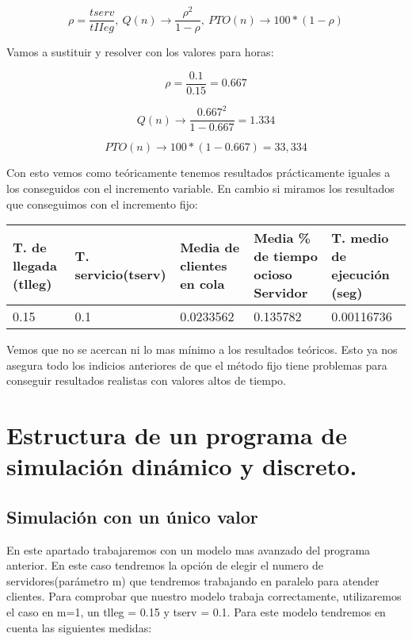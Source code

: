 \documentclass[]{article}
\begin{document}
$$\rho=\frac{ { tserv }}{ { tII eg }},\ Q(n) \rightarrow \frac{\rho^{2}}{1-\rho},\ P T O(n) \rightarrow 100 *(1-\rho)$$

Vamos a sustituir y resolver con los valores para horas:

$$\rho=\frac{ { 0.1 }}{ { 0.15 }} = 0.667 $$

$$Q(n) \rightarrow \frac{0.667^{2}}{1-0.667} = 1.334 $$

$$P T O(n) \rightarrow 100*(1-0.667) = 33,334$$

Con esto vemos como teóricamente tenemos resultados prácticamente iguales a los conseguidos con el incremento variable. En cambio si miramos los resultados que conseguimos con el incremento fijo:
\begin{table}[H]
	\begin{center}
		\begin{tabularx}{0.9\textwidth}{|X|X|X|X|X|}
			\hline
			\textbf{T. de llegada (tlleg)} & \textbf{T. servicio(tserv)}&\textbf{Media de clientes en cola} & \textbf{Media \% de tiempo ocioso Servidor} & \textbf{T. medio de ejecución (seg)} \\
			\hline \hline
			0.15 & 0.1 & 0.0233562 & 0.135782 &0.00116736\\ \hline
		\end{tabularx}
		
	\end{center}
\end{table}

Vemos que no se acercan ni lo mas mínimo a los resultados teóricos. Esto ya nos asegura todo los indicios anteriores de que el método fijo tiene problemas para conseguir resultados realistas con valores altos de tiempo.


\section{Estructura de un programa de simulación dinámico y discreto.}
\subsection{Simulación con un único valor}
En este apartado trabajaremos con un modelo mas avanzado del programa anterior. En este caso tendremos la opción de elegir el numero de servidores(parámetro m) que tendremos trabajando en paralelo para atender clientes. Para comprobar que nuestro modelo trabaja correctamente, utilizaremos el caso en m=1, un tlleg = 0.15 y tserv = 0.1. Para este modelo tendremos en cuenta las siguientes medidas:
\end{document}
